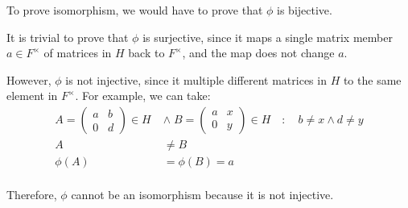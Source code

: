 \begin{problem}
\begin{enumalph}
\begin{Answer}
      \noindent
      To prove isomorphism, we would have to prove that $\phi$ is bijective.

        \begin{enumalph}
          \item It is trivial to prove that $\phi$ is surjective, since it maps
          a single matrix member $a \in F^\times$ of matrices in $H$ back to $F^\times$,
          and the map does not change $a$.
          \item However, $\phi$ is not injective, since it multiple different matrices
            in $H$ to the same element in $F^\times$. For example, we can take:
            \begin{align*}
              A = \begin{pmatrix} a & b \\ 0 & d \end{pmatrix} \in H
              \; &\land \;
              B = \begin{pmatrix} a & x \\ 0 & y \end{pmatrix} \in H
              \quad \colon \quad b \neq x \land d \neq y \\
              A &\neq B \\
              \phi(A) &= \phi(B) = a \\
            \end{align*}
        \end{enumalph}
      Therefore, $\phi$ cannot be an isomorphism because it is not injective.
    \end{Answer}
  \end{enumalph}
\end{problem}
